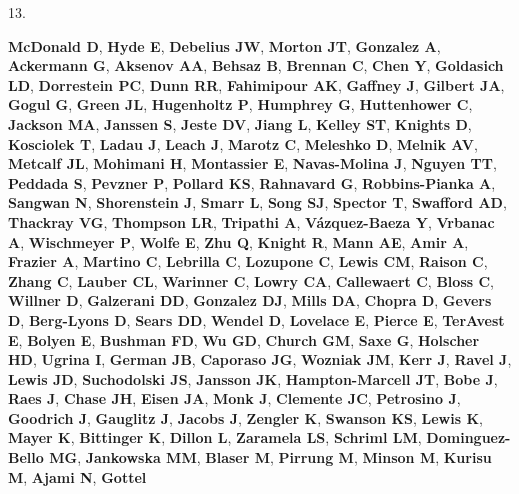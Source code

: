 \documentclass[
]{article}
\newlength{\cslhangindent}
\newlength{\csllabelwidth}
\newlength{\cslentryspacingunit} %
\newenvironment{CSLReferences}[2] %
 {%
  \setlength{\parindent}{0pt}
  \ifodd #1
  \let\oldpar\par
  \def\par{\hangindent=\cslhangindent\oldpar}
  \fi
  \setlength{\parskip}{#2\cslentryspacingunit}
 }%
 {}
\newcommand{\CSLLeftMargin}[1]{\parbox[t]{\csllabelwidth}{#1}}
\newcommand{\CSLRightInline}[1]{\parbox[t]{\linewidth - \csllabelwidth}{#1}\break}
\begin{document}
\begin{CSLReferences}{0}{1}
\leavevmode{}%
\CSLLeftMargin{13. }%
\CSLRightInline{\textbf{McDonald D}, \textbf{Hyde E}, \textbf{Debelius
JW}, \textbf{Morton JT}, \textbf{Gonzalez A}, \textbf{Ackermann G},
\textbf{Aksenov AA}, \textbf{Behsaz B}, \textbf{Brennan C}, \textbf{Chen
Y}, \textbf{Goldasich LD}, \textbf{Dorrestein PC}, \textbf{Dunn RR},
\textbf{Fahimipour AK}, \textbf{Gaffney J}, \textbf{Gilbert JA},
\textbf{Gogul G}, \textbf{Green JL}, \textbf{Hugenholtz P},
\textbf{Humphrey G}, \textbf{Huttenhower C}, \textbf{Jackson MA},
\textbf{Janssen S}, \textbf{Jeste DV}, \textbf{Jiang L}, \textbf{Kelley
ST}, \textbf{Knights D}, \textbf{Kosciolek T}, \textbf{Ladau J},
\textbf{Leach J}, \textbf{Marotz C}, \textbf{Meleshko D}, \textbf{Melnik
AV}, \textbf{Metcalf JL}, \textbf{Mohimani H}, \textbf{Montassier E},
\textbf{Navas-Molina J}, \textbf{Nguyen TT}, \textbf{Peddada S},
\textbf{Pevzner P}, \textbf{Pollard KS}, \textbf{Rahnavard G},
\textbf{Robbins-Pianka A}, \textbf{Sangwan N}, \textbf{Shorenstein J},
\textbf{Smarr L}, \textbf{Song SJ}, \textbf{Spector T}, \textbf{Swafford
AD}, \textbf{Thackray VG}, \textbf{Thompson LR}, \textbf{Tripathi A},
\textbf{Vázquez-Baeza Y}, \textbf{Vrbanac A}, \textbf{Wischmeyer P},
\textbf{Wolfe E}, \textbf{Zhu Q}, \textbf{Knight R}, \textbf{Mann AE},
\textbf{Amir A}, \textbf{Frazier A}, \textbf{Martino C},
\textbf{Lebrilla C}, \textbf{Lozupone C}, \textbf{Lewis CM},
\textbf{Raison C}, \textbf{Zhang C}, \textbf{Lauber CL},
\textbf{Warinner C}, \textbf{Lowry CA}, \textbf{Callewaert C},
\textbf{Bloss C}, \textbf{Willner D}, \textbf{Galzerani DD},
\textbf{Gonzalez DJ}, \textbf{Mills DA}, \textbf{Chopra D},
\textbf{Gevers D}, \textbf{Berg-Lyons D}, \textbf{Sears DD},
\textbf{Wendel D}, \textbf{Lovelace E}, \textbf{Pierce E},
\textbf{TerAvest E}, \textbf{Bolyen E}, \textbf{Bushman FD}, \textbf{Wu
GD}, \textbf{Church GM}, \textbf{Saxe G}, \textbf{Holscher HD},
\textbf{Ugrina I}, \textbf{German JB}, \textbf{Caporaso JG},
\textbf{Wozniak JM}, \textbf{Kerr J}, \textbf{Ravel J}, \textbf{Lewis
JD}, \textbf{Suchodolski JS}, \textbf{Jansson JK},
\textbf{Hampton-Marcell JT}, \textbf{Bobe J}, \textbf{Raes J},
\textbf{Chase JH}, \textbf{Eisen JA}, \textbf{Monk J}, \textbf{Clemente
JC}, \textbf{Petrosino J}, \textbf{Goodrich J}, \textbf{Gauglitz J},
\textbf{Jacobs J}, \textbf{Zengler K}, \textbf{Swanson KS},
\textbf{Lewis K}, \textbf{Mayer K}, \textbf{Bittinger K}, \textbf{Dillon
L}, \textbf{Zaramela LS}, \textbf{Schriml LM}, \textbf{Dominguez-Bello
MG}, \textbf{Jankowska MM}, \textbf{Blaser M}, \textbf{Pirrung M},
\textbf{Minson M}, \textbf{Kurisu M}, \textbf{Ajami N}, \textbf{Gottel
}}
\end{CSLReferences}
\end{document}
